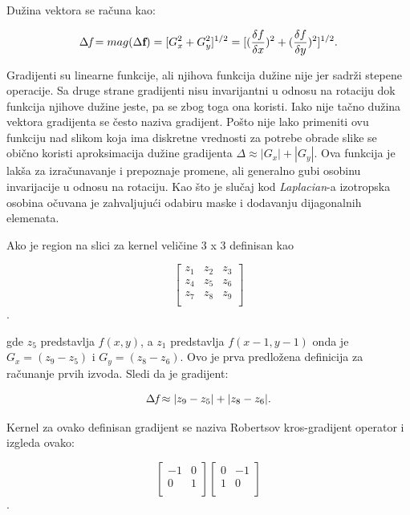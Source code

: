 \documentclass[a4paper,12pt,titlepage]{article}
\begin{document}
Dužina vektora se računa kao: 

\begin{equation}\label{eq:grad12}
\Delta \emph{f} = mag(\Delta \textbf{f}) = [G_{x}^{2} + G_{y}^{2}]^{1/2} = [ (\dfrac{\delta f}{\delta x})^{2} + (\dfrac{\delta f}{\delta y})^{2} ]^{1/2}. 
\end{equation}

Gradijenti su linearne funkcije, ali njihova funkcija dužine nije jer sadrži stepene operacije. Sa druge strane gradijenti nisu invarijantni u odnosu na rotaciju dok funkcija njihove dužine jeste, pa se zbog toga ona koristi. Iako nije tačno dužina vektora gradijenta se često naziva gradijent. Pošto nije lako primeniti ovu funkciju nad slikom koja ima diskretne vrednosti za potrebe obrade slike se obično koristi aproksimacija dužine gradijenta $\Delta \approx |G_{x}| + |G_{y}|$. Ova funkcija je lakša za izračunavanje i prepoznaje promene, ali generalno gubi osobinu invarijacije u odnosu na rotaciju. Kao što je slučaj kod \emph{Laplacian}-a izotropska osobina očuvana je zahvaljujući odabiru maske i dodavanju dijagonalnih elemenata. 

Ako je region na slici za kernel veličine 3 x 3 definisan kao

\[
\begin{bmatrix}
z_{1} & z_{2} & z_{3} \\
z_{4} & z_{5} & z_{6} \\
z_{7} & z_{8} & z_{9} \\
\end{bmatrix}
\].

gde $z_{5}$ predstavlja $f(x, y)$, a $z_{1}$ predstavlja $f(x - 1, y - 1)$ onda je $G_{x} = (z_{9} - z_{5})$ i $G_{y} = (z_{8} - z_{6})$. Ovo je prva predložena definicija za računanje prvih izvoda. Sledi da je gradijent:

\begin{equation}\label{eq:grad13}
\Delta \emph{f} \approx |z_{9} - z_{5}| + |z_{8} - z_{6}|.
\end{equation}

Kernel za ovako definisan gradijent se naziva Robertsov kros-gradijent operator i izgleda ovako:

\[
\begin{bmatrix}
-1 & 0 \\
0 & 1 \\
\end{bmatrix}
\begin{bmatrix}
0 & -1 \\
1 & 0 \\
\end{bmatrix}
\].
\end{document}
